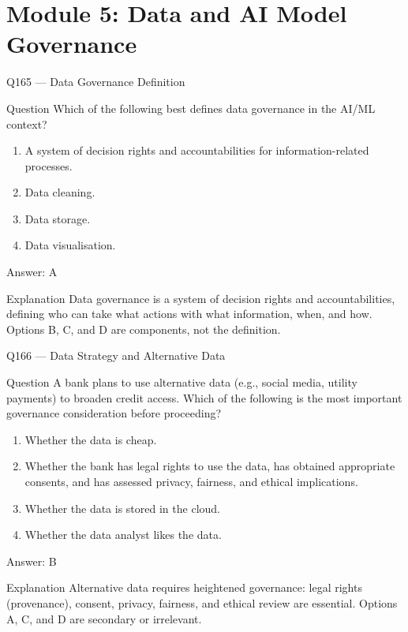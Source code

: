 \documentclass[aspectratio=169,8pt]{beamer}
\begin{document}
\section{Module 5: Data and AI Model Governance}

\begin{frame}{Q165 --- Data Governance Definition}
\begin{block}{Question}
Which of the following best defines data governance in the AI/ML context?
\begin{enumerate}
\item A system of decision rights and accountabilities for information-related processes.
\item Data cleaning.
\item Data storage.
\item Data visualisation.
\end{enumerate}  \end{block}
\begin{exampleblock}{Answer: A}\end{exampleblock}
\begin{block}{Explanation}
Data governance is a system of decision rights and accountabilities, defining who can take what actions with what information, when, and how. Options B, C, and D are components, not the definition.
\end{block}
\end{frame}

\begin{frame}{Q166 --- Data Strategy and Alternative Data}
\begin{block}{Question}
A bank plans to use alternative data (e.g., social media, utility payments) to broaden credit access. Which of the following is the most important governance consideration before proceeding?
\begin{enumerate}
\item Whether the data is cheap.
\item Whether the bank has legal rights to use the data, has obtained appropriate consents, and has assessed privacy, fairness, and ethical implications.
\item Whether the data is stored in the cloud.
\item Whether the data analyst likes the data.
\end{enumerate}  \end{block}
\begin{exampleblock}{Answer: B}\end{exampleblock}
\begin{block}{Explanation}
Alternative data requires heightened governance: legal rights (provenance), consent, privacy, fairness, and ethical review are essential. Options A, C, and D are secondary or irrelevant.
\end{block}
\end{frame}
\end{document}
